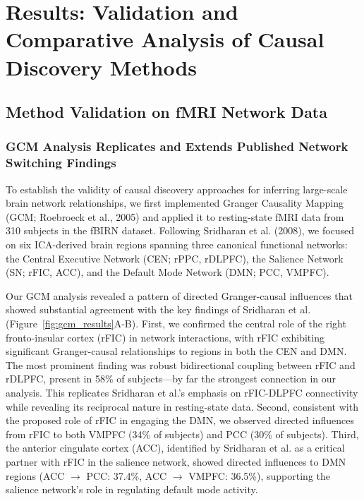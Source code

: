 \section{Results: Validation and Comparative Analysis of Causal Discovery Methods}

\subsection{Method Validation on fMRI Network Data}

\subsubsection{GCM Analysis Replicates and Extends Published Network Switching Findings}

To establish the validity of causal discovery approaches for inferring large-scale brain network relationships, we first implemented Granger Causality Mapping (GCM; Roebroeck et al., 2005) and applied it to resting-state fMRI data from 310 subjects in the fBIRN dataset. Following Sridharan et al. (2008), we focused on six ICA-derived brain regions spanning three canonical functional networks: the Central Executive Network (CEN; rPPC, rDLPFC), the Salience Network (SN; rFIC, ACC), and the Default Mode Network (DMN; PCC, VMPFC). 

Our GCM analysis revealed a pattern of directed Granger-causal influences that showed substantial agreement with the key findings of Sridharan et al. (Figure~\ref{fig:gcm_results}A-B). First, we confirmed the central role of the right fronto-insular cortex (rFIC) in network interactions, with rFIC exhibiting significant Granger-causal relationships to regions in both the CEN and DMN. The most prominent finding was robust bidirectional coupling between rFIC and rDLPFC, present in 58\% of subjects—by far the strongest connection in our analysis. This replicates Sridharan et al.'s emphasis on rFIC-DLPFC connectivity while revealing its reciprocal nature in resting-state data. Second, consistent with the proposed role of rFIC in engaging the DMN, we observed directed influences from rFIC to both VMPFC (34\% of subjects) and PCC (30\% of subjects). Third, the anterior cingulate cortex (ACC), identified by Sridharan et al. as a critical partner with rFIC in the salience network, showed directed influences to DMN regions (ACC $\rightarrow$ PCC: 37.4\%, ACC $\rightarrow$ VMPFC: 36.5\%), supporting the salience network's role in regulating default mode activity.

